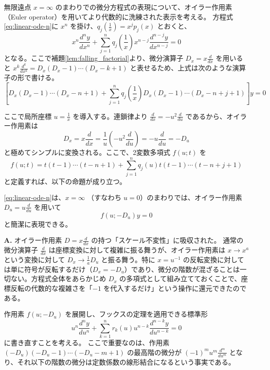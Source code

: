 無限遠点 $x=\infty$ のまわりでの微分方程式の表現について、オイラー作用素（Euler operator）を用いてより代数的に洗練された表示を考える。
方程式\eqref{eq:linear-ode-n}に $x^{n}$ を掛け、$q_{j}\left(\frac{1}{x}\right) = x^{j}p_{j}(x)$ とおくと、
\begin{equation}\label{eq:ode-euler-x}
x^{n}\frac{d^{n}y}{dx^{n}} + \sum_{j=1}^{n} q_{j}\left(\frac{1}{x}\right) x^{n-j}\frac{d^{n-j}y}{dx^{n-j}} = 0
\end{equation}
となる。ここで補題\ref{lem:falling_factorial}より、微分演算子 $D_{x} = x\frac{d}{dx}$ を用いると $x^{k}\frac{d^{k}}{dx^{k}} = D_{x}(D_{x}-1)\cdots(D_{x}-k+1)$ と表せるため、上式は次のような演算子の形で書ける。
\[
\left[ D_{x}(D_{x}-1)\cdots(D_{x}-n+1) + \sum_{j=1}^{n}q_{j}\left(\frac{1}{x}\right) D_{x}(D_{x}-1)\cdots(D_{x}-n+j+1) \right] y = 0
\]

ここで局所座標 $u = \frac{1}{x}$ を導入する。連鎖律より $\frac{d}{dx} = -u^{2}\frac{d}{du}$ であるから、オイラー作用素は
\[
D_{x} = x\frac{d}{dx} = \frac{1}{u}\left(-u^{2}\frac{d}{du}\right) = -u\frac{d}{du} = -D_{u}
\]
と極めてシンプルに変換される。ここで、2変数多項式 $f(u; t)$ を
\[
f(u; t) = t(t-1)\cdots(t-n+1) + \sum_{j=1}^{n} q_{j}(u) t(t-1)\cdots(t-n+j+1)
\]
と定義すれば、以下の命題が成り立つ。

\begin{proposition}
\eqref{eq:linear-ode-n}は、$x=\infty$ （すなわち $u=0$）のまわりでは、オイラー作用素 $D_{u} = u\frac{d}{du}$ を用いて
\[
f(u; -D_{u})y = 0
\]
と簡潔に表現できる。
\end{proposition}

\begin{Q}[【核心】$x=\frac{1}{u}$ という変換で生じるはずの「連鎖律による複雑な低階項の混ざり合い」は、どこへ消えたのか？]
\textbf{A.} オイラー作用素 $D = x\frac{d}{dx}$ の持つ「スケール不変性」に吸収された。
通常の微分演算子 $\frac{d}{dx}$ は座標変換に対して複雑に振る舞うが、オイラー作用素は $x \to x^{a}$ という変換に対して $D_{x} \to \frac{1}{a} D_{u}$ と振る舞う。特に $x = u^{-1}$ の反転変換に対しては単に符号が反転するだけ（$D_{x} = -D_{u}$）であり、微分の階数が混ざることは一切ない。方程式全体をあらかじめ $D_{x}$ の多項式として組み立てておくことで、座標反転の代数的な複雑さを「$-1$ を代入するだけ」という操作に還元できたのである。
\end{Q}

作用素 $f(u; -D_{u})$ を展開し、フックスの定理を適用できる標準形
\[
u^{n}\frac{d^{n}y}{du^{n}} + \sum_{k=1}^{n} r_{k}(u) u^{n-k}\frac{d^{n-k}y}{du^{n-k}} = 0
\]
に書き直すことを考える。
ここで重要なのは、作用素 $(-D_{u})(-D_{u}-1)\cdots(-D_{u}-m+1)$ の最高階の微分が $(-1)^{m} u^{m} \frac{d^{m}}{du^{m}}$ となり、それ以下の階数の微分は定数係数の線形結合になるという事実である。

